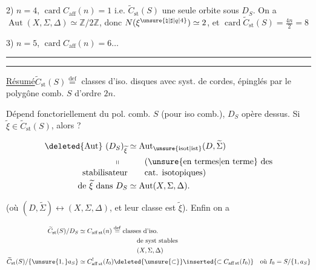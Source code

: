 
2) $n=4$, $\operatorname{card} C_{\mathrm{aff}}(n)=1$ i.e. $\widetilde C_{\mathrm{st}}(S)$ une seule orbite sous $D_S$.  On a $\operatorname{Aut}(X,\Sigma,\Delta)\simeq\mathbb Z/2\mathbb Z$, donc $N(\xi^{\unsure{\natural|\sharp|q|4}})\simeq 2$, et $\operatorname{card}\widetilde C_{\mathrm{st}}(S)=\frac{4n}{2}=8$

3) $n=5$, $\operatorname{card} C_{\mathrm{aff}}(n)=6\ldots$

\noindent\rule{\linewidth}{0.35pt}\par\noindent\rule{\linewidth}{0.35pt}

\uline{Résumé}\qquad $\widetilde C_{\mathrm{st}}(S)\overset{\mathrm{def}}{=}$ classes d'iso.  disques avec syst.  de cordes, épinglés par le polygône comb. $S$ d'ordre $2n$.

Dépend fonctoriellement du pol. comb. $S$ (pour iso comb.),   $D_S$ opère dessus. Si $\widetilde\xi\in\widetilde C_{\mathrm{st}}(S)$, alors ?

\[
\begin{aligned}
\deleted{\operatorname{Aut}}\ (D_S)_{\widetilde\xi}&\simeq\operatorname{Aut}_{\unsure{\mathrm{isot}|\mathrm{ist}}}(D,\widetilde\Sigma)\\
\shortparallel\quad&\qquad\text{(\unsure{en termes|en terme} des}\\[-2pt]
\text{stabilisateur}&\qquad\text{cat. isotopiques)}\\[-2pt]
\text{de }\widetilde\xi\text{ dans }D_S&\simeq\operatorname{Aut}(X,\Sigma,\Delta).
\end{aligned}
\]

(où $(D,\widetilde\Sigma)\longleftrightarrow(X,\Sigma,\Delta)$, et leur classe est $\widetilde\xi$). Enfin on a

\[
\begin{aligned}
\widetilde C_{\mathrm{st}}(S)/D_S&\simeq C_{\mathrm{aff\,st}}(n)\overset{\mathrm{def}}{=}\text{classes d'iso.}\\
&\hspace{9em}\text{de syst stables}\\
&\hspace{9em}(X,\Sigma,\Delta)\\
\widetilde C_{\mathrm{st}}(S)/\{\unsure{1,}a_S\}&\simeq C_{\mathrm{aff\,st}}^{!}(I_0)\deleted{\unsure{\subset}}\inserted{\subset C_{\mathrm{aff\,st}}(I_0)}\quad\text{où } I_0=S/\{1,a_S\}
\end{aligned}
\]
